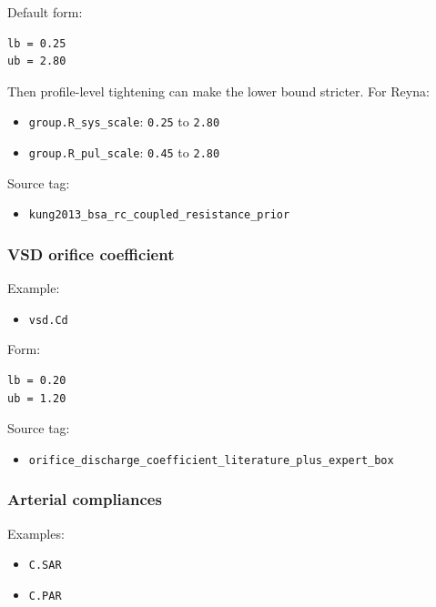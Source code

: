 \documentclass[11pt,a4paper]{article}
\begin{document}
Default form:

\begin{verbatim}
lb = 0.25
ub = 2.80
\end{verbatim}

Then profile-level tightening can make the lower bound stricter. For Reyna:

\begin{itemize}[leftmargin=1.5em]
    \item \texttt{group.R\_sys\_scale}: \texttt{0.25} to \texttt{2.80}
    \item \texttt{group.R\_pul\_scale}: \texttt{0.45} to \texttt{2.80}
\end{itemize}

Source tag:

\begin{itemize}[leftmargin=1.5em]
    \item \texttt{kung2013\_bsa\_rc\_coupled\_resistance\_prior}
\end{itemize}

\subsubsection{VSD orifice coefficient}

Example:

\begin{itemize}[leftmargin=1.5em]
    \item \texttt{vsd.Cd}
\end{itemize}

Form:

\begin{verbatim}
lb = 0.20
ub = 1.20
\end{verbatim}

Source tag:

\begin{itemize}[leftmargin=1.5em]
    \item \texttt{orifice\_discharge\_coefficient\_literature\_plus\_expert\_box}
\end{itemize}

\subsubsection{Arterial compliances}

Examples:

\begin{itemize}[leftmargin=1.5em]
    \item \texttt{C.SAR}
    \item \texttt{C.PAR}
\end{itemize}
\end{document}
